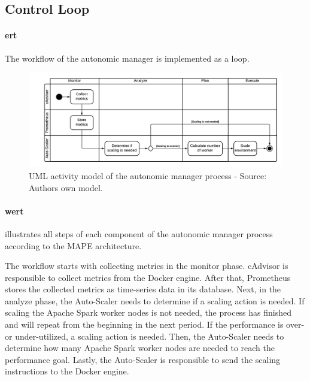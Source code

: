 \subsection{Control Loop}

\paragraph{ert} The workflow of the autonomic manager is implemented as a loop.

\begin{figure}[h]
\centering
\includegraphics[scale=0.50]{images/05_conceptual_design/autonomic_manager/autonomic_manager_workflow}
\caption{UML activity model of the autonomic manager process - Source: Authors own model.}
\label{fig:am-workflow}
\end{figure}
\paragraph{wert}  illustrates all steps of each component of the autonomic manager process according to the MAPE architecture.


The workflow starts with collecting metrics in the monitor phase. cAdvisor is responsible to collect metrics from the Docker engine. After that, Prometheus stores the collected metrics as time-series data in its database.
Next, in the analyze phase, the Auto-Scaler needs to determine if a scaling action is needed. If scaling the Apache Spark worker nodes is not needed, the process has finished and will repeat from the beginning in the next period.
If the performance is over- or under-utilized, a scaling action is needed. Then, the Auto-Scaler needs to determine how many Apache Spark worker nodes are needed to reach the performance goal.
Lastly, the Auto-Scaler is responsible to send the scaling instructions to the Docker engine.
